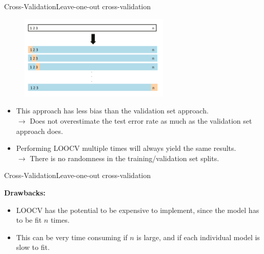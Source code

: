 \begin{frame}{Cross-Validation}{Leave-one-out cross-validation}

\begin{figure}
    \centering
    \includegraphics[height=4cm]{cross-val/l-o-o-cv.png}
\end{figure} \pause 

\begin{itemize}
    \item This approach has less bias than the validation set approach. \\ \pause  
    $\rightarrow$ Does not overestimate the test error rate as much as the validation set approach does. \pause 
    
    \item Performing LOOCV multiple times will always yield the same results. \\ \pause 
    $\rightarrow$ There is no randomness in the training/validation set splits.
\end{itemize}
    
\end{frame}


\begin{frame}{Cross-Validation}{Leave-one-out cross-validation}

\begin{block}{\textbf{Drawbacks:}}

    \begin{itemize}
        \item LOOCV has the potential to be expensive to implement, since the model has to be fit $n$ times. \pause 

        \item This can be very time consuming if $n$ is large, and if
each individual model is slow to fit.
    \end{itemize}

\end{block}

    
\end{frame}